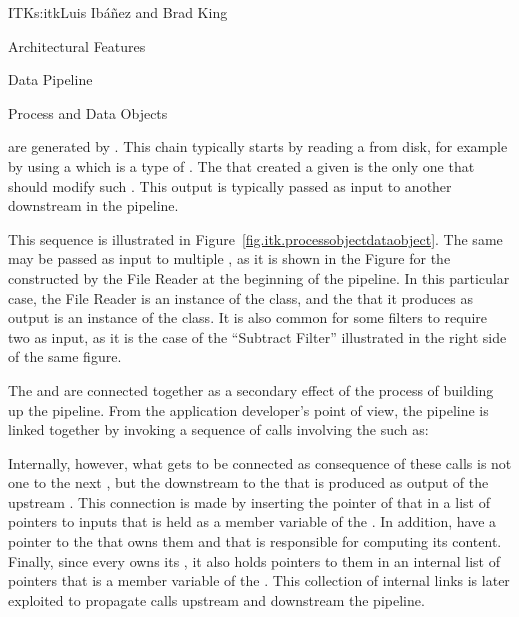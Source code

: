 \begin{aosachapter}{ITK}{s:itk}{Luis Ib\'{a}\~{n}ez and Brad King}
\begin{aosasect1}{Architectural Features}
\begin{aosasect2}{Data Pipeline}
\begin{aosasect3}{Process and Data Objects}

 are generated by . This chain typically starts by
reading a  from disk, for example by using a  which is
a type of . The  that created a given  is
the only one that should modify such . This output  is
typically passed as input to another  downstream in the pipeline.

This sequence is illustrated in Figure~\ref{fig.itk.processobjectdataobject}.
The same  may be passed as input to multiple
, as it is shown in the Figure for the 
constructed by the File Reader at the beginning of the pipeline.
In this particular case, the File Reader is an instance of the
 class, and the  that it produces as
output is an instance of the  class.
It is also common for some filters to require two  as input,
as it is the case of the ``Subtract Filter'' illustrated in the right side of
the same figure.

The  and  are connected together as a
secondary effect of the process of building up the pipeline. From the
application developer's point of view, the pipeline is linked together by
invoking a sequence of calls involving the  such as:

\begin{aosaitemize}
\item {}
\item {}
\item {}
\end{aosaitemize}

Internally, however, what gets to be connected as consequence of these calls is
not one  to the next , but the
downstream  to the  that is produced as
output of the upstream . This connection is made by
inserting the pointer of that  in a list of pointers to inputs
that is held as a member variable of the . In addition,
 have a pointer to the  that owns them
and that is responsible for computing its content. Finally, since every
 owns its , it also holds pointers to
them in an internal list of pointers that is a member variable of the
. This collection of internal links is later exploited to
propagate calls upstream and downstream the pipeline.



\end{aosasect3}
\end{aosasect2}
\end{aosasect1}
\end{aosachapter}
